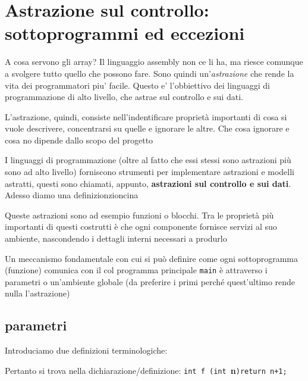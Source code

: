 \chapter{Astrazione sul controllo: sottoprogrammi ed eccezioni}

A cosa servono gli array? Il linguaggio assembly non ce li ha, ma riesce comunque a svolgere tutto quello che possono fare. Sono quindi un'\textit{astrazione} che rende la vita dei programmatori piu' facile. Questo e' l'obbiettivo dei linguaggi di programmazione di alto livello, che astrae sul controllo e sui dati. 

L'astrazione, quindi, consiste nell'indentificare proprietà importanti di cosa si vuole descrivere, concentrarsi su quelle e ignorare le altre. Che cosa ignorare e cosa no dipende dallo scopo del progetto

I linguaggi di programmazione (oltre al fatto che essi stessi sono astrazioni più sono ad alto livello) forniscono strumenti per implementare astrazioni e modelli astratti, questi sono chiamati, appunto, \textbf{astrazioni sul controllo e sui dati}. Adesso diamo una definizionzioncina


Queste astrazioni sono ad esempio funzioni o blocchi. Tra le proprietà più importanti di questi costrutti è che ogni componente fornisce servizi al suo ambiente, nascondendo i dettagli interni necessari a produrlo

Un meccanismo fondamentale con cui si può definire come ogni sottoprogramma (funzione) comunica con il col programma principale \texttt{main} è attraverso i parametri o un'ambiente globale (da preferire i primi perché quest'ultimo rende nulla l'astrazione)

\section{parametri}

Introduciamo due definizioni terminologiche:

Pertanto si trova nella dichiarazione/definizione: \texttt{int f (int }\textbf{n}\texttt{){return n+1;}}

